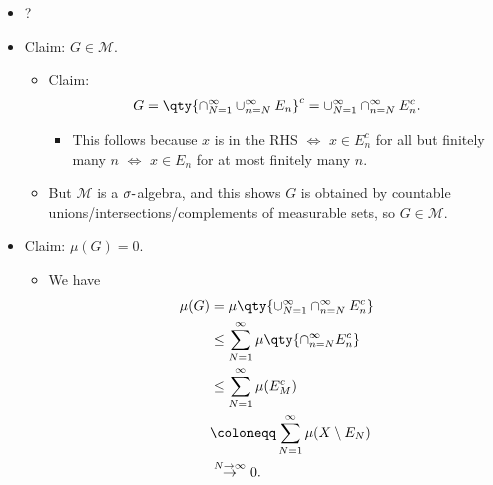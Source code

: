 \begin{solution}

\hfill

\begin{concept}

\hfill

\begin{itemize}
\tightlist
\item
  ?
\end{itemize}

\end{concept}

\begin{itemize}
\item
  Claim: \(G\in {\mathcal{M}}\).

  \begin{itemize}
  \item
    Claim:
    \begin{align*}  
    G = \qty{ \cap_{N=1}^\infty \cup_{n=N}^\infty E_n}^c = \cup_{N=1}^\infty \cap_{n=N}^\infty E_n^c
    .\end{align*}

    \begin{itemize}
    \tightlist
    \item
      This follows because \(x\) is in the RHS \(\iff\) \(x\in E_n^c\)
      for all but finitely many \(n\) \(\iff\) \(x\in E_n\) for at most
      finitely many \(n\).
    \end{itemize}
  \item
    But \({\mathcal{M}}\) is a \(\sigma{\hbox{-}}\)algebra, and this
    shows \(G\) is obtained by countable
    unions/intersections/complements of measurable sets, so
    \(G\in {\mathcal{M}}\).
  \end{itemize}
\item
  Claim: \(\mu(G) = 0\).

  \begin{itemize}
  \tightlist
  \item
    We have
    \begin{align*}  
    \mu(G)
    &= \mu\qty{\cup_{N=1}^\infty \cap_{n=N}^\infty E_n^c} \\
    &\leq \sum_{N=1}^\infty \mu \qty{\cap_{n=N}^\infty E_n^c}  \\
    &\leq \sum_{N=1}^\infty \mu(E_M^c) \\ 
    &\coloneqq\sum_{N=1}^\infty \mu(X\setminus E_N) \\
    &\overset{N\to\infty}\to 0
    .\end{align*}
  \end{itemize}
\end{itemize}


\end{solution}

